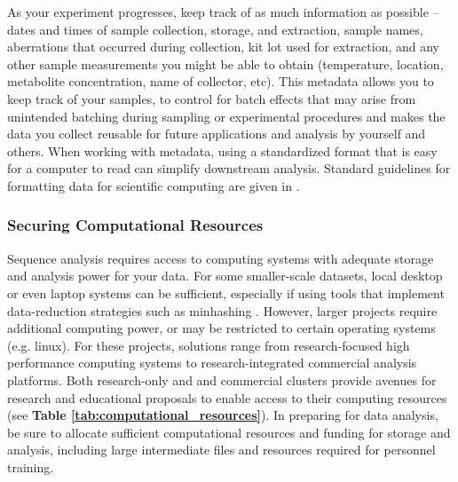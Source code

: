 \documentclass[10pt,letterpaper]{article}
\begin{document}
As your experiment progresses, keep track of as much information as possible -- dates and times of sample collection, storage, and extraction, sample names, aberrations that occurred during collection, kit lot used for extraction, and any other sample measurements you might be able to obtain (temperature, location, metabolite concentration, name of collector, etc). 
This metadata allows you to keep track of your samples, to control for batch effects that may arise from unintended batching during sampling or experimental procedures and makes the data you collect reusable for future applications and analysis by yourself and others.
When working with metadata, using a standardized format that is easy for a computer to read can simplify downstream analysis. 
Standard guidelines for formatting data for scientific computing are given in \cite{wilson2017good}.

\subsubsection*{Securing Computational Resources}

Sequence analysis requires access to computing systems with adequate storage and analysis power for your data. 
For some smaller-scale datasets, local desktop or even laptop systems can be sufficient, especially if using tools that implement data-reduction strategies such as minhashing \cite{rowe2019streaming}. 
However, larger projects require additional computing power, or may be restricted to certain operating systems (e.g. linux). 
For these projects, solutions range from research-focused high performance computing systems to research-integrated commercial analysis platforms. 
Both research-only and  and commercial clusters provide avenues for research and educational proposals to enable access to their computing resources (see \textbf{Table \ref{tab:computational_resources}}). 
In preparing for data analysis, be sure to allocate sufficient computational resources and funding for storage and analysis, including large intermediate files and resources required for personnel training. 
\end{document}
